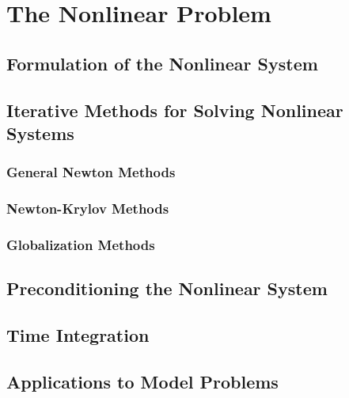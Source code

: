 \chapter{The Nonlinear Problem}
\label{ch:nonlinear_problem}

\section{Formulation of the Nonlinear System}
\label{sec:nonlinear_system}

\section{Iterative Methods for Solving Nonlinear Systems}
\label{sec:nonlinear_methods}

\subsection{General Newton Methods}
\label{subsec:newton_methods}

\subsection{Newton-Krylov Methods}
\label{subsec:newton_krylov_methods}

\subsection{Globalization Methods}
\label{subsec:globalization_methods}

\section{Preconditioning the Nonlinear System}
\label{sec:nonlinear_preconditioning}

\section{Time Integration}
\label{sec:time_integration}

\section{Applications to Model Problems}
\label{sec:nonlinear_applications}
